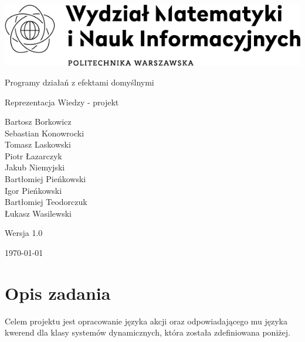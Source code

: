 \documentclass[11pt,a4paper]{article}
\begin{document}
    \begin{titlepage}
        \centering
        \includegraphics[width=\textwidth]{resources/WMiNI-znak-black.png} \par
        \vspace{3cm}
        {\LARGE Programy działań z efektami domyślnymi \par}
        \vspace{0.5cm}
        {\Large Reprezentacja Wiedzy - projekt \par}
        \vspace{2cm}
        {\large
            Bartosz Borkowicz\\
            Sebastian Konowrocki\\
            Tomasz Laskowski\\
            Piotr Łazarczyk\\
            Jakub Niemyjski\\
            Bartłomiej Pieńkowski\\
            Igor Pieńkowski\\
            Bartłomiej Teodorczuk\\
            Łukasz Wasilewski
        \par}
        \vspace{4cm}
        {\large Wersja 1.0 \par}
        \vspace{0.5cm}
        {\large \today \par}
    \end{titlepage}

    \tableofcontents
    \newpage

    \section{Opis zadania}
    
    Celem projektu jest opracowanie języka akcji oraz odpowiadającego mu języka kwerend dla klasy systemów dynamicznych, która została zdefiniowana poniżej.
    
\end{document}
